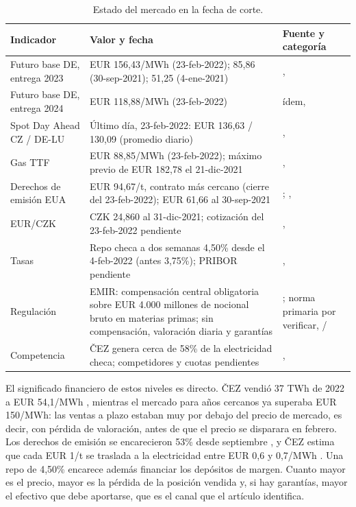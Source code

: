 \documentclass[11pt,letterpaper]{article}
\theoremstyle{plain}
\theoremstyle{definition}
\theoremstyle{remark}
\numberwithin{equation}{section}
\newcommand{\sw}{\begin{singlespace}}
\newcommand{\ew}{\end{singlespace}}
\begin{document}
\sw
\begin{table}[ht]
	\centering
	\footnotesize
		\begin{tabularx}{\textwidth}{@{}>{\RaggedRight}p{3.0cm}>{\RaggedRight}X>{\RaggedRight}p{3.4cm}@{}}
			\toprule
				Indicador & Valor y fecha & Fuente y categoría \\
			\midrule
				Futuro base DE, entrega 2023 & EUR 156,43/MWh (23-feb-2022); 85,86 (30-sep-2021); 51,25 (4-ene-2021) & \textcite{energycharts_futuros_de},  \\
				Futuro base DE, entrega 2024 & EUR 118,88/MWh (23-feb-2022) & ídem,  \\
				Spot Day Ahead CZ / DE-LU & Último día, 23-feb-2022: EUR 136,63 / 130,09 (promedio diario) & \textcite{energycharts_spot2022},  \\
				Gas TTF & EUR 88,85/MWh (23-feb-2022); máximo previo de EUR 182,78 el 21-dic-2021 & \textcite{platts_ttf_2022},  \\
				Derechos de emisión EUA & EUR 94,67/t, contrato más cercano (cierre del 23-feb-2022); EUR 61,66 al 30-sep-2021 & \textcite{gasstrategies_2022}; \parencite[p.~18]{cez_interim_q3_2021},  \\
				EUR/CZK & CZK 24,860 al 31-dic-2021; cotización del 23-feb-2022 pendiente & \parencite[p.~30]{cez_fs_2021},  \\
				Tasas & Repo checa a dos semanas 4,50\% desde el 4-feb-2022 (antes 3,75\%); PRIBOR pendiente & \textcite{cnb_2022},  \\
				Regulación & EMIR: compensación central obligatoria sobre EUR 4.000 millones de nocional bruto en materias primas; sin compensación, valoración diaria y garantías & \parencite[p.~18]{GIANNOZZI2026107700}; norma primaria por verificar, / \\
				Competencia & ČEZ genera cerca de 58\% de la electricidad checa; competidores y cuotas pendientes & \parencite[p.~11]{cez_fs_2021},  \\
			\bottomrule
		\end{tabularx}
	\caption{Estado del mercado en la fecha de corte.}
	\label{tab:mercado}
\end{table}
\ew

El significado financiero de estos niveles es directo. ČEZ vendió 37 TWh de 2022 a 
EUR 54,1/MWh \parencite{cez_q3_2021}, mientras el mercado para años cercanos ya superaba 
EUR 150/MWh: las ventas a plazo estaban muy por debajo del precio de mercado, es decir, 
con pérdida de valoración, antes de que el precio se disparara en febrero. Los derechos 
de emisión se encarecieron 53\% desde septiembre , y ČEZ estima que cada EUR 1/t se 
traslada a la electricidad entre EUR 0,6 y 0,7/MWh \parencite{cez_story_2022}. 
Una repo de 4,50\% encarece además financiar los depósitos de margen. Cuanto mayor 
es el precio, mayor es la pérdida de la posición vendida y, si hay garantías, mayor 
el efectivo que debe aportarse, que es el canal que el artículo identifica.
\end{document}
